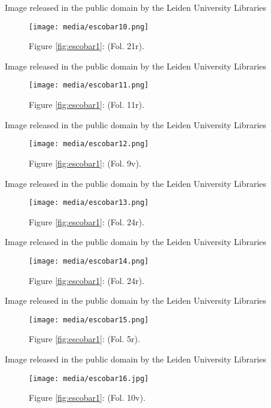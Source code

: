 \documentclass{article}
\begin{document}
 Image released in the public domain by the Leiden University Libraries 


  \begin{figure}
    \texttt{[image: media/escobar10.png]}
    \caption{Figure \ref{fig:escobar1}: (Fol. 21r).}
    \label{fig:escobar10}
  \end{figure}

 Image released in the public domain by the Leiden University Libraries 


  \begin{figure}
    \texttt{[image: media/escobar11.png]}
    \caption{Figure \ref{fig:escobar1}: (Fol. 11r).}
    \label{fig:escobar11}
\end{figure}

 Image released in the public domain by the Leiden University Libraries 


\begin{figure}[H]
  \centering
  \texttt{[image: media/escobar12.png]}
    \caption{Figure \ref{fig:escobar1}: (Fol. 9v).}
    \label{fig:escobar12}
  \end{figure}

 Image released in the public domain by the Leiden University Libraries 


\begin{figure}[H]
  \centering
    \texttt{[image: media/escobar13.png]}
    \caption{Figure \ref{fig:escobar1}: (Fol. 24r).}
    \label{fig:escobar13}
  \end{figure}

 Image released in the public domain by the Leiden University Libraries 


  \begin{figure}
    \texttt{[image: media/escobar14.png]}
    \caption{Figure \ref{fig:escobar1}: (Fol. 24r).}
    \label{fig:escobar14}
  \end{figure}

 Image released in the public domain by the Leiden University Libraries 


  \begin{figure}[H]
  \centering
    \texttt{[image: media/escobar15.png]}
    \caption{Figure \ref{fig:escobar1}: (Fol. 5r).}
    \label{fig:escobar15}
  \end{figure}

 Image released in the public domain by the Leiden University Libraries 


  \begin{figure}
    \texttt{[image: media/escobar16.jpg]}
    \caption{Figure \ref{fig:escobar1}: (Fol. 10v).}
    \label{fig:escobar16}
  \end{figure}
\end{document}
